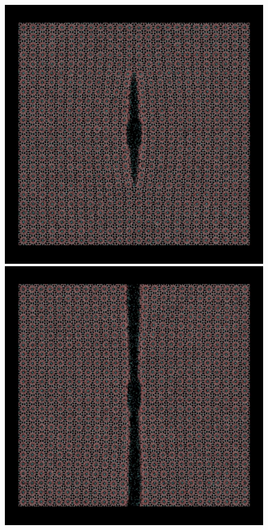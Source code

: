 \begin{figure}
\begin{minipage}[b]{0.5\linewidth}
\end{minipage}
\begin{minipage}[b]{0.5\linewidth}
\includegraphics[width=\textwidth]{../snapshots/c_3.pdf}
\end{minipage}
\begin{minipage}[b]{0.5\linewidth}
\includegraphics[width=\textwidth]{../snapshots/c_4.pdf}

\end{minipage}
\end{figure}
